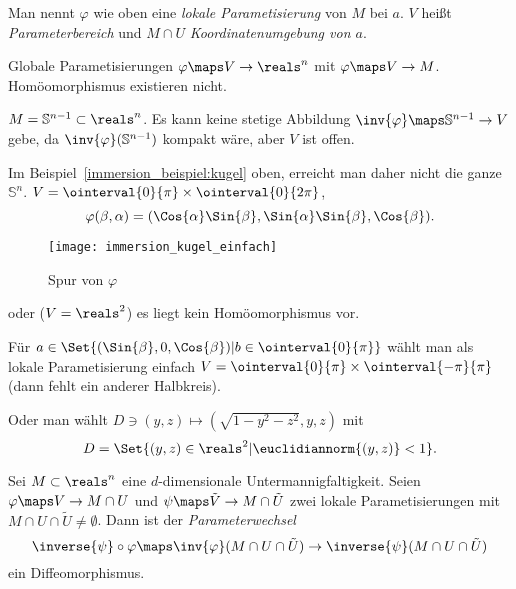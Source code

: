 \begin{bemerkungen*}
  \item Man nennt \( \varphi \) wie oben eine \emph{lokale Parametisierung} von \( M \) bei \( a \). \( V \) heißt \emph{Parameterbereich} und \( M\cap U \) \emph{Koordinatenumgebung von \( a \)}.
  \item Globale Parametisierungen \( \varphi\maps V\to\reals^n \) mit \( \varphi\maps V\to M \). Homöomorphismus existieren \ia nicht.
  \begin{beispiel*}
    \( M=\mathbb{S}^{n-1}\subset \reals^n \). Es kann keine stetige Abbildung \( \inv{\varphi}\maps \mathbb{S}^{n-1}\to V \) gebe, da \( \inv{\varphi}(\mathbb{S}^{n-1}) \) kompakt wäre, aber \( V \) ist offen.
    
    Im Beispiel~\ref{immersion_beispiel:kugel} oben, erreicht man daher nicht die ganze \( \mathbb{S}^n \). \( V=\ointerval{0}{\pi}\times \ointerval{0}{2\pi} \),
    \begin{equation*}
      \varphi(\beta,\alpha)=(\Cos{\alpha}\Sin{\beta},\Sin{\alpha}\Sin{\beta},\Cos{\beta}).
    \end{equation*}
    \begin{figure}[H]
      \centering
      \texttt{[image: immersion\_kugel\_einfach]}
      \caption*{Spur von \( \varphi \)}
      \label{fig:immersion_kugel_einfach}
    \end{figure}
    oder (\( V=\reals^2 \)) es liegt kein Homöomorphismus vor.

    Für \( a\in \Set{(\Sin{\beta},0,\Cos{\beta})|b\in \ointerval{0}{\pi}} \) wählt man als lokale Parametisierung einfach \( V=\ointerval{0}{\pi}\times \ointerval{-\pi}{\pi} \) (dann fehlt ein anderer Halbkreis).

    Oder man wählt \( D\ni (y,z)\mapsto (\sqrt{1-y^2-z^2},y,z) \) mit
    \begin{equation*}
      D=\Set{(y,z)\in \reals^2|\euclidiannorm{(y,z)}<1}.
    \end{equation*}
  \end{beispiel*}
\end{bemerkungen*}
\begin{satz}[Parameterwechsel]\label{parameterwechsel}
  Sei \( M\subset \reals^n \) eine \( d \)-dimensionale Untermannigfaltigkeit. Seien \( \varphi\maps V\to M\cap U \) und \( \psi\maps \tilde{V}\to M\cap \tilde{U} \) zwei lokale Parametisierungen mit \( M\cap U\cap \tilde{U}\neq \emptyset \). Dann ist der \emph{Parameterwechsel}   
  \begin{equation*}
    \inverse{\psi}\circ \varphi\maps \inv{\varphi}(M\cap U\cap \tilde{U})\to \inverse{\psi}(M\cap U\cap \tilde{U})
  \end{equation*}
  ein Diffeomorphismus.
\end{satz}
